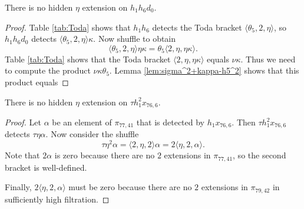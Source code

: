 \begin{lemma}
\label{lem:eta-h1h6d0}
There is no hidden $\eta$ extension on $h_1 h_6 d_0$.
\end{lemma}

\begin{proof}
Table \ref{tab:Toda} shows that $h_1 h_6$ detects the Toda bracket
$\langle \theta_5, 2, \eta \rangle$, so
$h_1 h_6 d_0$ detects
$\langle \theta_5, 2, \eta \rangle \kappa$.
Now shuffle to obtain
\[
\langle \theta_5, 2, \eta \rangle \eta \kappa = 
\theta_5 \langle 2, \eta, \eta \kappa \rangle.
\]
Table \ref{tab:Toda} shows that the Toda bracket
$\langle 2, \eta, \eta \kappa \rangle$ equals $\nu \kappa$.
Thus we need to compute the product
$\nu \kappa \theta_5$.
Lemma \ref{lem:sigma^2+kappa-h5^2} shows that this
product equals 
\end{proof}

\begin{lemma}
\label{lem:eta-th1^2x76,6}
There is no hidden $\eta$ extension on $\tau h_1^2 x_{76,6}$.
\end{lemma}

\begin{proof}
Let $\alpha$ be an element of $\pi_{77,41}$ that is detected by
$h_1 x_{76,6}$.
Then $\tau h_1^2 x_{76,6}$ detects $\tau \eta \alpha$.
Now consider the shuffle
\[
\tau \eta^2 \alpha = \langle 2, \eta, 2 \rangle \alpha =
2 \langle \eta, 2, \alpha \rangle.
\]
Note that $2 \alpha$ is zero because there are no $2$ extensions
in $\pi_{77,41}$, so the second bracket is well-defined.

Finally, 
$2 \langle \eta, 2, \alpha \rangle$ must be zero because there are 
no $2$ extensions in $\pi_{79,42}$ in sufficiently high filtration.
\end{proof}


